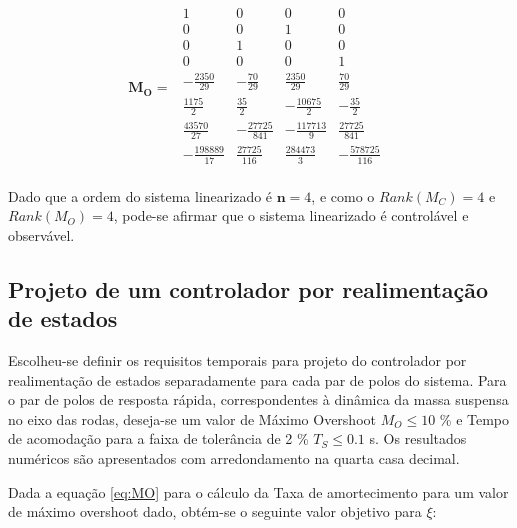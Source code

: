 \documentclass[a4paper]{ifacconf}
\begin{document}
    \begin{equation} \label{eq:MO}
        \begin{split}
             \mathbf{M_O}=
        \end{split}
        \begin{smallmatrix}
           1&              0&              0&              0&\\
           0&              0&              1&              0&\\       
           0&              1&              0&              0&\\       
           0&              0&              0&              1&\\    
       -\frac{2350}{29}&   -\frac{70}{29}&      \frac{2350}{29}&   \frac{ 70}{29}&\\    
        \frac{1175}{2}&     \frac{35}{2}&      -\frac{10675}{2}&  -\frac{35}{2}&\\    
        \frac{43570}{27}&  -\frac{27725}{841}& -\frac{117713}{9}&  \frac{27725}{841}&\\
       -\frac{198889}{17}&  \frac{27725}{116}&  \frac{284473}{3}& -\frac{578725}{116}&\\
        \end{smallmatrix}
    \end{equation}

Dado que a ordem do sistema linearizado é $\mathbf{n}=4$, e como o $Rank(M_C)=4$ e $Rank(M_O)=4$, pode-se afirmar que o sistema linearizado é controlável e observável.

\subsection{Projeto de um controlador por realimentação de estados} \label{sc:projeto_controlador_full}

Escolheu-se definir os requisitos temporais para projeto do controlador por realimentação de estados separadamente para cada par de polos do sistema. Para o par de polos de resposta rápida, correspondentes à dinâmica da massa suspensa no eixo das rodas, deseja-se um valor de Máximo Overshoot $M_O \leq 10$ \% e Tempo de acomodação para a faixa de tolerância de 2 \% $T_S \leq 0.1$ s. Os resultados numéricos são apresentados com arredondamento na quarta casa decimal.

Dada a equação \ref{eq:MO} para o cálculo da Taxa de amortecimento para um valor de máximo overshoot dado, obtém-se o seguinte valor objetivo para $\xi$:
\end{document}
